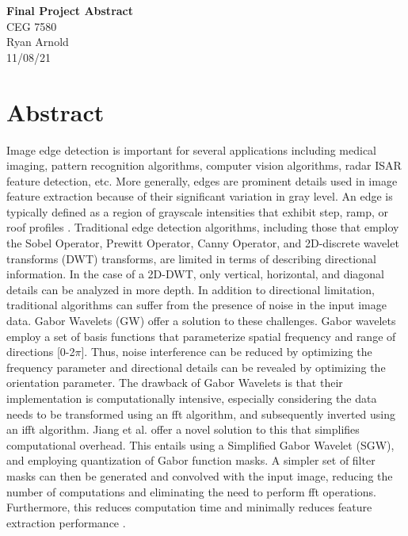 \documentclass[./abstract_proposal.tex]{subfiles}
\begin{document}


\begin{titlepage}

\noindent
\centering \Huge \textbf{Final Project Abstract} \\
CEG 7580\\
Ryan Arnold \\
11/08/21
\vspace{24pt}

\end{titlepage}

\clearpage
\section*{Abstract}

\noindent Image edge detection is important for several applications including medical imaging, pattern recognition algorithms, computer vision algorithms, radar ISAR feature detection, etc.  More generally, edges are prominent details used in image feature extraction because of their significant variation in gray level.  An edge is typically defined as a region of grayscale intensities that exhibit step, ramp, or roof profiles \cite{book}.  Traditional edge detection algorithms, including those that employ the Sobel Operator, Prewitt Operator, Canny Operator, and 2D-discrete wavelet transforms (DWT) transforms, are limited in terms of describing directional information.  In the case of a 2D-DWT, only vertical, horizontal, and diagonal details can be analyzed in more depth.  In addition to directional limitation, traditional algorithms can suffer from the presence of noise in the input image data.  Gabor Wavelets (GW) offer a solution to these challenges.  Gabor wavelets employ a set of basis functions that parameterize spatial frequency and range of directions [0-2$\pi$].  Thus, noise interference can be reduced by optimizing the frequency parameter and directional details can be revealed by optimizing the orientation parameter.  The drawback of Gabor Wavelets is that their implementation is computationally intensive, especially considering the data needs to be transformed using an fft algorithm, and subsequently inverted using an ifft algorithm.  Jiang et al. offer a novel solution to this that simplifies computational overhead.  This entails using a Simplified Gabor Wavelet (SGW), and employing quantization of Gabor function masks.  A simpler set of filter masks can then be generated and convolved with the input image, reducing the number of computations and eliminating the need to perform fft operations.  Furthermore, this reduces computation time and minimally reduces feature extraction performance \cite{main_paper}.
\end{document}
